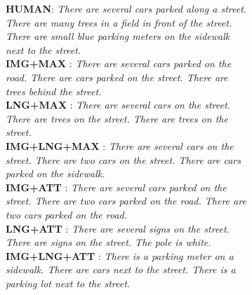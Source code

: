 \documentclass[11pt,a4paper]{article}
\begin{document}
  \begin{figure}[t]
    \centering
    \begin{subfigure}[t]{.47\textwidth}
        \centering
        \caption{ \textbf{HUMAN}: \textit{There are several cars parked along a street. There are many trees in a field in front of the street. There are small blue parking meters on the sidewalk next to the street.}\\
 \textbf{IMG+MAX} : \textit{There are several cars parked on the road. There are cars parked on the street. There are trees behind the street.}\\
 \textbf{LNG+MAX} : \textit{There are several cars on the street. There are trees on the street. There are trees on the street.}\\
 \textbf{IMG+LNG+MAX} : \textit{There are several cars on the street. There are two cars on the street. There are cars parked on the sidewalk.} \\
 \textbf{IMG+ATT} : \textit{There are several cars parked on the street. There are two cars parked on the road. There are two cars parked on the road.}\\
 \textbf{LNG+ATT} : \textit{There are several signs on the street. There are signs on the street. The pole is white.}\\
 \textbf{IMG+LNG+ATT} : \textit{There is a parking meter on a sidewalk. There are cars next to the street. There is a parking lot next to the street.} }
        \label{fig:goodexample}
    \end{subfigure}%
    \hfill
    \begin{subfigure}[t]{.48\textwidth}

\end{subfigure}
\end{figure}
\end{document}
